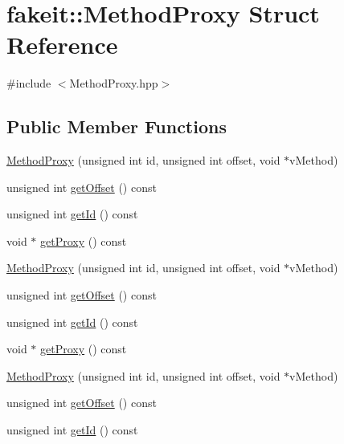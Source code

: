 \hypertarget{structfakeit_1_1MethodProxy}{}\section{fakeit\+::Method\+Proxy Struct Reference}
\label{structfakeit_1_1MethodProxy}


{\ttfamily \#include $<$Method\+Proxy.\+hpp$>$}

\subsection*{Public Member Functions}
\begin{DoxyCompactItemize}
\item 
\mbox{\hyperlink{structfakeit_1_1MethodProxy_a425b37c610166fd5368505aa53cc970c}{Method\+Proxy}} (unsigned int id, unsigned int offset, void $\ast$v\+Method)
\item 
unsigned int \mbox{\hyperlink{structfakeit_1_1MethodProxy_abc59fc5a670eda3f83c981cf4ac7bd68}{get\+Offset}} () const
\item 
unsigned int \mbox{\hyperlink{structfakeit_1_1MethodProxy_a00370ab06d9c4f4b9affb9ec3bdd72fe}{get\+Id}} () const
\item 
void $\ast$ \mbox{\hyperlink{structfakeit_1_1MethodProxy_ab27c6485484c610f7a35bb832fc571ea}{get\+Proxy}} () const
\item 
\mbox{\hyperlink{structfakeit_1_1MethodProxy_a425b37c610166fd5368505aa53cc970c}{Method\+Proxy}} (unsigned int id, unsigned int offset, void $\ast$v\+Method)
\item 
unsigned int \mbox{\hyperlink{structfakeit_1_1MethodProxy_abc59fc5a670eda3f83c981cf4ac7bd68}{get\+Offset}} () const
\item 
unsigned int \mbox{\hyperlink{structfakeit_1_1MethodProxy_a00370ab06d9c4f4b9affb9ec3bdd72fe}{get\+Id}} () const
\item 
void $\ast$ \mbox{\hyperlink{structfakeit_1_1MethodProxy_ab27c6485484c610f7a35bb832fc571ea}{get\+Proxy}} () const
\item 
\mbox{\hyperlink{structfakeit_1_1MethodProxy_a425b37c610166fd5368505aa53cc970c}{Method\+Proxy}} (unsigned int id, unsigned int offset, void $\ast$v\+Method)
\item 
unsigned int \mbox{\hyperlink{structfakeit_1_1MethodProxy_abc59fc5a670eda3f83c981cf4ac7bd68}{get\+Offset}} () const
\item 
unsigned int \mbox{\hyperlink{structfakeit_1_1MethodProxy_a00370ab06d9c4f4b9affb9ec3bdd72fe}{get\+Id}} () const

\end{DoxyCompactItemize}
